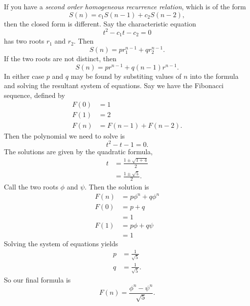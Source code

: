 \documentclass[nobib]{tufte-handout}
\begin{document}
If you have a \emph{second order homogeneous recurrence relation},
which is of the form 
\[S(n) = c_1 S(n-1) + c_2 S(n-2),\]
then the closed form is different. 
Say the characteristic equation
\[t^2 -c_1 t - c_2 = 0\]
has two roots 
$r_1$ and $r_2$. Then
\[S(n) = pr_1^{n-1} + qr_2^{n-1}.\]
If the two roots are not distinct, then 
\[S(n) = pr^{n-1} + q(n-1)r^{n-1}.\]
In either case $p$ and $q$ may be found by substiting 
values of $n$ into the formula and solving the resultant 
system of equations. Say we have the Fibonacci sequence, defined by 
\begin{align*}
    F(0) &= 1 \\
    F(1) &= 2 \\
    F(n) &= F(n-1) + F(n-2).
\end{align*}
Then the polynomial we need to solve is 
\[t^2 - t - 1 = 0.\]
The solutions are given by the quadratic formula, 
\begin{align*}
    t &= \frac{1 \pm \sqrt{1 + 4}}{2} \\
    &= \frac{1 \pm \sqrt{5}}{2}.
\end{align*}
Call the two roots $\phi$ and $\psi$. Then the solution is 
\begin{align*}
    F(n) &= p\phi^{n} + q\phi^{n} \\
    F(0) &= p + q \\
    &= 1 \\
    F(1) &= p\phi + q\psi \\
    &= 1
\end{align*}
Solving the system of equations yields 
\begin{align*}
    p &= \frac{1}{\sqrt{5}} \\
    q &= \frac{1}{\sqrt{5}}.
\end{align*}
So our final formula is 
\[F(n) = \frac{\phi^n - \psi^n}{\sqrt{5}}.\]
\end{document}
